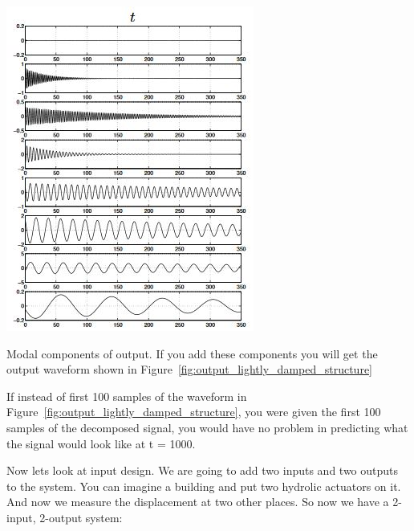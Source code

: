 \documentclass{../tufte-handout}
\begin{document}
\begin{marginfigure}
  \includegraphics[width=\linewidth]{modal_components_output_lightly_damped_structure}
  \caption{Modal components of output. If you add these components you will get the output waveform shown in Figure~\ref{fig:output_lightly_damped_structure}}
  \label{fig:modal_components_output_lightly_damped_structure}
\end{marginfigure}

If instead of first 100 samples of the waveform in Figure~\ref{fig:output_lightly_damped_structure}, you were given the first 100 samples of the decomposed signal, you would have no problem in predicting what the signal would look like at t = 1000. 

Now lets look at input design. We are going to add two inputs and two outputs to the system. You can imagine a building and put two hydrolic actuators on it. And now we measure the displacement at two other places. So now we have a 2-input, 2-output system: \newline
\end{document}
